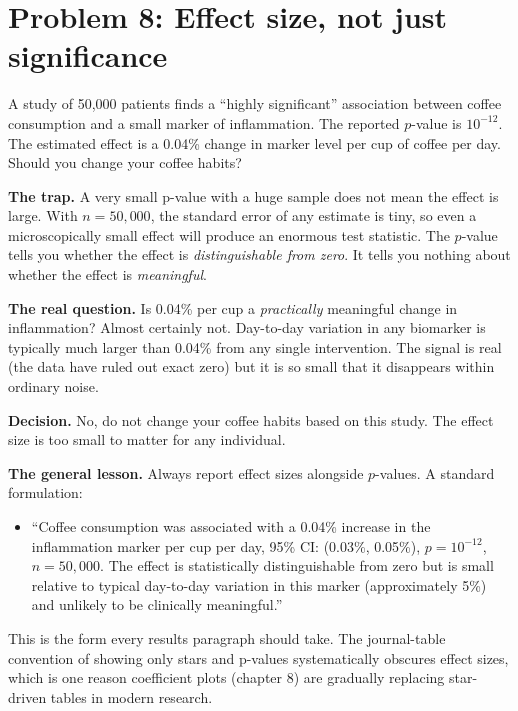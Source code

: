 \documentclass[
  letterpaper,
  11pt,
  twoside,
  openany]{scrbook}
\providecommand{\tightlist}{%
  \setlength{\itemsep}{0pt}\setlength{\parskip}{0pt}}
\begin{document}
\section{Problem 8: Effect size, not just
significance}\label{problem-8-effect-size-not-just-significance}

A study of 50,000 patients finds a ``highly significant'' association
between coffee consumption and a small marker of inflammation. The
reported \(p\)-value is \(10^{-12}\). The estimated effect is a 0.04\%
change in marker level per cup of coffee per day. Should you change your
coffee habits?

\begin{tcolorbox}[enhanced jigsaw, arc=.35mm, bottomrule=.15mm, bottomtitle=1mm, breakable, colback=white, colbacktitle=quarto-callout-note-color!10!white, colframe=quarto-callout-note-color-frame, coltitle=black, left=2mm, leftrule=.75mm, opacityback=0, opacitybacktitle=0.6, rightrule=.15mm, title=\textcolor{quarto-callout-note-color}{\faInfo}\hspace{0.5em}{Solution to Problem 8}, titlerule=0mm, toprule=.15mm, toptitle=1mm]

\textbf{The trap.} A very small p-value with a huge sample does not mean
the effect is large. With \(n = 50{,}000\), the standard error of any
estimate is tiny, so even a microscopically small effect will produce an
enormous test statistic. The \(p\)-value tells you whether the effect is
\emph{distinguishable from zero}. It tells you nothing about whether the
effect is \emph{meaningful}.

\textbf{The real question.} Is 0.04\% per cup a \emph{practically}
meaningful change in inflammation? Almost certainly not. Day-to-day
variation in any biomarker is typically much larger than 0.04\% from any
single intervention. The signal is real (the data have ruled out exact
zero) but it is so small that it disappears within ordinary noise.

\textbf{Decision.} No, do not change your coffee habits based on this
study. The effect size is too small to matter for any individual.

\textbf{The general lesson.} Always report effect sizes alongside
\(p\)-values. A standard formulation:

\begin{itemize}
\tightlist
\item
  ``Coffee consumption was associated with a 0.04\% increase in the
  inflammation marker per cup per day, 95\% CI: (0.03\%, 0.05\%),
  \(p = 10^{-12}\), \(n = 50{,}000\). The effect is statistically
  distinguishable from zero but is small relative to typical day-to-day
  variation in this marker (approximately 5\%) and unlikely to be
  clinically meaningful.''
\end{itemize}

This is the form every results paragraph should take. The journal-table
convention of showing only stars and p-values systematically obscures
effect sizes, which is one reason coefficient plots (chapter 8) are
gradually replacing star-driven tables in modern research.

\end{tcolorbox}
\end{document}
